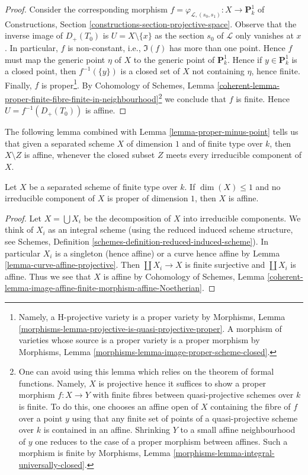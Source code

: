 \begin{proof}
\medskip\noindent
Consider the corresponding morphism
$f = \varphi_{\mathcal{L}, (s_0, s_1)} : X \to \mathbf{P}^1_k$
of Constructions, Section \ref{constructions-section-projective-space}.
Observe that the inverse image of $D_{+}(T_0)$ is $U = X \setminus \{x\}$
as the section $s_0$ of $\mathcal{L}$ only vanishes at $x$.
In particular, $f$ is non-constant, i.e., $\Im(f)$ has more
than one point. Hence $f$ must map the generic
point $\eta$ of $X$ to the generic point of $\mathbf{P}^1_k$.
Hence if $y \in \mathbf{P}^1_k$ is a closed point, then $f^{-1}(\{y\})$
is a closed set of $X$ not containing $\eta$, hence finite.
Finally, $f$ is proper\footnote{Namely, a H-projective variety
is a proper variety by Morphisms, Lemma
\ref{morphisms-lemma-projective-is-quasi-projective-proper}.
A morphism of varieties whose source is a proper variety is a proper morphism
by Morphisms, Lemma \ref{morphisms-lemma-image-proper-scheme-closed}.}.
By Cohomology of Schemes, Lemma
\ref{coherent-lemma-proper-finite-fibre-finite-in-neighbourhood}\footnote{One
can avoid using this lemma which relies on the theorem of formal
functions. Namely, $X$ is projective hence it suffices to show
a proper morphism $f : X \to Y$ with finite fibres between quasi-projective
schemes over $k$ is finite. To do this, one chooses an affine open of $X$
containing the fibre of $f$ over a point $y$ using that any finite set of
points of a quasi-projective scheme over $k$ is contained in an affine.
Shrinking $Y$ to a small affine neighbourhood of $y$ one reduces to the
case of a proper morphism between affines. Such a morphism is finite by
Morphisms, Lemma \ref{morphisms-lemma-integral-universally-closed}.}
we conclude that $f$ is finite. Hence $U = f^{-1}(D_{+}(T_0))$
is affine.
\end{proof}

\noindent
The following lemma combined with Lemma \ref{lemma-proper-minus-point}
tells us that given a separated scheme $X$ of dimension $1$ and
of finite type over $k$, then $X \setminus Z$ is affine, whenever the
closed subset $Z$ meets every irreducible component of $X$.

\begin{lemma}
\label{lemma-dim-1-nonproper-affine}
Let $X$ be a separated scheme of finite type over $k$.
If $\dim(X) \leq 1$ and no irreducible component of $X$
is proper of dimension $1$, then $X$ is affine.
\end{lemma}

\begin{proof}
Let $X = \bigcup X_i$ be the decomposition of $X$ into irreducible components.
We think of $X_i$ as an integral scheme (using the reduced induced scheme
structure, see Schemes, Definition
\ref{schemes-definition-reduced-induced-scheme}).
In particular $X_i$ is a singleton (hence affine) or a curve
hence affine by Lemma \ref{lemma-curve-affine-projective}.
Then $\coprod X_i \to X$ is finite surjective and $\coprod X_i$ is affine.
Thus we see that $X$ is affine by
Cohomology of Schemes, Lemma
\ref{coherent-lemma-image-affine-finite-morphism-affine-Noetherian}.
\end{proof}






